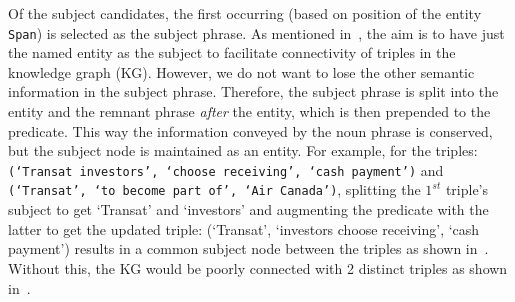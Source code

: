 Of the subject candidates, the first occurring (based on position of the entity \texttt{Span}) is selected as the subject phrase. As mentioned in~, the aim is to have just the named entity as the subject to facilitate connectivity of triples in the knowledge graph (KG). However, we do not want to lose the other semantic information in the subject phrase. Therefore, the subject phrase is split into the entity and the remnant phrase \textit{after} the entity, which is then prepended to the predicate. This way the information conveyed by the noun phrase is conserved, but the subject node is maintained as an entity. For example, for the triples: \texttt{(`Transat investors', `choose receiving', `cash payment')} and \texttt{(`Transat', `to become part of', `Air Canada')}, splitting the $1^{st}$ triple's subject to get `Transat' and `investors' and augmenting the predicate with the latter to get the updated triple: (`Transat', `investors choose receiving', `cash payment') results in a common subject node between the triples as shown in~. Without this, the KG would be poorly connected with 2 distinct triples as shown in~.
  
